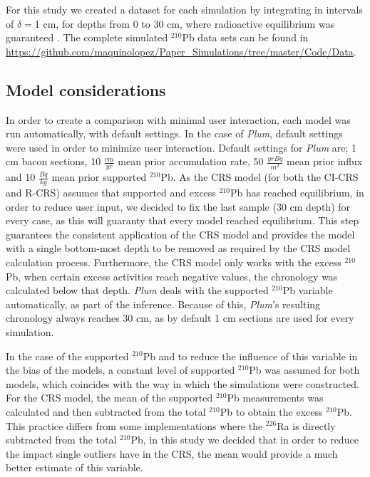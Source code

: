 \documentclass [10pt] {article}
\begin{document}
For this study we created a dataset for each simulation by integrating in intervals of $\delta =$1 cm, for depths from  0 to 30 cm, where radioactive equilibrium was guaranteed \citep{Aquino2018}.
The complete simulated $^{210}$Pb data sets can be found in \url{https://github.com/maquinolopez/Paper_Simulations/tree/master/Code/Data}.

\subsection{Model considerations}
In order to create a comparison with minimal user interaction, each model was run automatically, with default settings.
In the case of \textit{Plum}, default settings were used in order to minimize user interaction.
Default settings for \textit{Plum} are; 1 cm bacon sections, 10 $\frac{cm}{yr}$ mean prior accumulation rate, 50 $\frac{yr Bq}{m^2}$ mean prior influx and 10 $\frac{Bq}{kg}$ mean prior supported $^{210}$Pb.
As the CRS model (for both the CI-CRS and R-CRS) assumes that supported and excess $^{210}$Pb has reached equilibrium, in order to reduce user input, we decided to fix the last sample (30 cm depth) for every case, as this will guaranty that every model reached equilibrium.
This step guarantees the consistent application of the CRS model and provides the model with a single bottom-most depth to be removed as required by the CRS model calculation process. 
Furthermore, the CRS model only works with the excess $^{210}$Pb, when certain excess activities reach negative values, the chronology was calculated below that depth.
\textit{Plum} deals with the supported $^{210}$Pb variable automatically, as part of the inference.
Because of this, \textit{Plum}'s resulting chronology always reaches 30 cm, as by default 1 cm sections are used for every simulation.

In the case of the supported $^{210}$Pb and to reduce the influence of this variable in the bias of the models, a constant level of supported $^{210}$Pb was assumed for both models, which coincides with the way in which the simulations were constructed.
For the CRS model, the mean of the supported $^{210}$Pb measurements was calculated and then subtracted from the total $^{210}$Pb to obtain the excess $^{210}$Pb.
This practice differs from some implementations where the $^{226}$Ra is directly subtracted from the total $^{210}$Pb, in this study we decided that in order to reduce the impact single outliers have in the CRS, the mean would provide a much better estimate of this variable.
\end{document}
